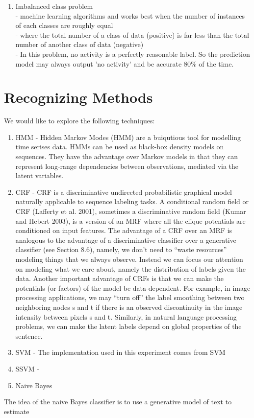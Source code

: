 \documentclass[11pt, oneside]{article}   	%
\begin{document}
\begin{enumerate}
\begin{enumerate}
	\item Imbalanced class problem\\
		- machine learning algorithms and works best when the number of instances of each classes are roughly equal\\
		- where the total number of a class of data (positive) is far less than the total number of another class of data (negative)	\\
		- In this problem, no activity is a perfectly reasonable label. So the prediction model may always output 'no activity' and be accurate 80\% of the time.\\
		\end{enumerate}

\end{enumerate}

\section{Recognizing Methods}
We would like to explore the following techniques:
	\begin{enumerate}
\item HMM - 
Hidden Markov Modes (HMM) are a buiqutious tool for modelling time serises  data.  HMMs can be used as black-box density models on sequences. They have the advantage over Markov models in that they can represent long-range dependencies between observations, mediated via the latent variables. 

\item CRF - 
CRF is a discriminative undirected probabilistic graphical model naturally applicable to sequence labeling tasks. A conditional random field or CRF (Lafferty et al. 2001), sometimes a discriminative random field (Kumar and Hebert 2003), is  a version of an MRF where all the clique potentials are conditioned on input features. The advantage of a CRF over an MRF is analogous to the advantage of a discriminative classifier over a generative classifier (see Section 8.6), namely, we don’t need to “waste resources” modeling things that we always observe. Instead we can focus our attention on modeling what we care about, namely the distribution of labels given the data.
Another important advantage of CRFs is that we can make the potentials (or factors) of the model be data-dependent. For example, in image processing applications, we may “turn off” the label smoothing between two neighboring nodes s and t if there is an observed discontinuity in the image intensity between pixels s and t. Similarly, in natural language processing problems, we can make the latent labels depend on global properties of the sentence. 

\item SVM - 
The implementation used in this experiment comes from SVM

\item SSVM - 

\item Naive Bayes
	\end{enumerate}
The idea of the naive Bayes classifier is to use a generative model of text to estimate
\end{document}
